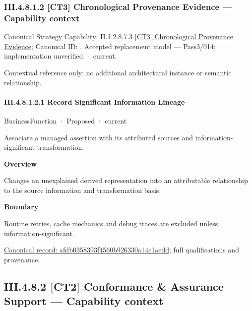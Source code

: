 \subsubsection*{III.4.8.1.2 [CT3] Chronological Provenance Evidence — Capability context}
\label{navigation:III.4.8.1.2}

{\small Canonical Strategy Capability: II.1.2.8.7.3 \hyperref[element:95c06dba5448453992d55106b19f977d]{[CT3] Chronological Provenance Evidence}; Canonical ID: \texttt{}. Accepted replacement model — Pass3/014; implementation unverified · current.}\par
Contextual reference only; no additional architectural instance or semantic relationship.\par
\paragraph*{III.4.8.1.2.1 Record Significant Information Lineage}
\label{navigation:III.4.8.1.2.1}

\label{element:afdb0358393f4560b926330a14c1aedd}
{\small BusinessFunction · Proposed · current}\par

Associate a managed assertion with its attributed sources and information-significant transformation.



\textbf{Overview}



Changes an unexplained derived representation into an attributable relationship to the source information and transformation basis.



\textbf{Boundary}



Routine retries, cache mechanics and debug traces are excluded unless information-significant.


{\footnotesize \href{../../../../../../../../continuum/business/business-function/afdb0358393f4560b926330a14c1aedd.md}{Canonical record: afdb0358393f4560b926330a14c1aedd}; full qualifications and provenance.}\par
\subsection*{III.4.8.2 [CT2] Conformance \& Assurance Support — Capability context}
\label{navigation:III.4.8.2}

